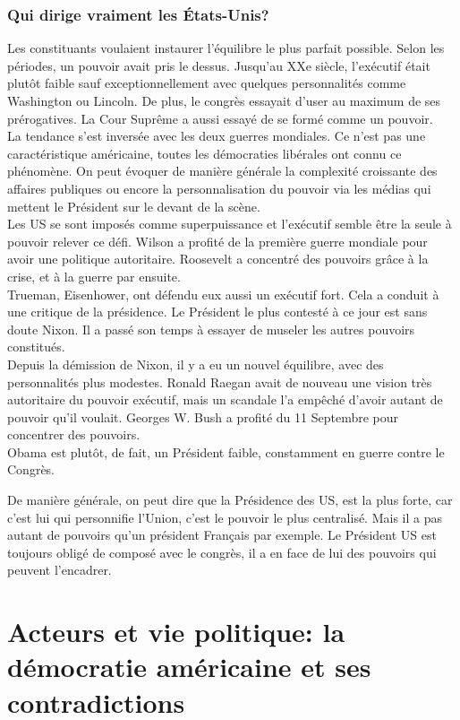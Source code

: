 \documentclass[10pt, a4paper, openany]{book}
\begin{document}
\subsubsection{Qui dirige vraiment les États-Unis?}

Les constituants voulaient instaurer l'équilibre le plus parfait possible. Selon les périodes, un pouvoir avait pris le dessus. Jusqu'au XXe siècle, l'exécutif était plutôt faible sauf exceptionnellement avec quelques personnalités comme Washington ou Lincoln. De plus, le congrès essayait d'user au maximum de ses prérogatives. La Cour Suprême a aussi essayé de se formé comme un pouvoir. \\
La tendance s'est inversée avec les deux guerres mondiales. Ce n'est pas une caractéristique américaine, toutes les démocraties libérales ont connu ce phénomène. On peut évoquer de manière générale la complexité croissante des affaires publiques ou encore la personnalisation du pouvoir via les médias qui mettent le Président sur le devant de la scène. \\
Les US se sont imposés comme superpuissance et l'exécutif semble être la seule à pouvoir relever ce défi. Wilson a profité de la première guerre mondiale pour avoir une politique autoritaire. Roosevelt a concentré des pouvoirs grâce à la crise, et à la guerre par ensuite. \\
Trueman, Eisenhower, ont défendu eux aussi un exécutif fort. Cela a conduit à une critique de la présidence. Le Président le plus contesté à ce jour est sans doute Nixon. Il a passé son temps à essayer de museler les autres pouvoirs constitués. \\
Depuis la démission de Nixon, il y a eu un nouvel équilibre, avec des personnalités plus modestes. Ronald Raegan avait de nouveau une vision très autoritaire du pouvoir exécutif, mais un scandale l'a empêché d'avoir autant de pouvoir qu'il voulait. Georges W. Bush a profité du 11 Septembre pour concentrer des pouvoirs. \\
Obama est plutôt, de fait, un Président faible, constamment en guerre contre le Congrès. 


De manière générale, on peut dire que la Présidence des US, est la plus forte, car c'est lui qui personnifie l'Union, c'est le pouvoir le plus centralisé. Mais il a pas autant de pouvoirs qu'un président Français par exemple. Le Président US est toujours obligé de composé avec le congrès, il a en face de lui des pouvoirs qui peuvent l'encadrer. 

\section{Acteurs et vie politique: la démocratie américaine et ses contradictions}
\end{document}
